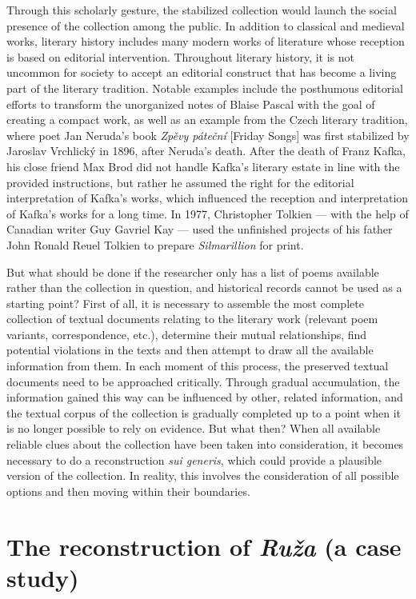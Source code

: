 \begin{paper}
Through this scholarly gesture, the stabilized collection would launch
the social presence of the collection among the public. In addition to
classical and medieval works, literary history includes many modern
works of literature whose reception is based on editorial intervention.
Throughout literary history, it is not uncommon for society to accept an
editorial construct that has become a living part of the literary
tradition. Notable examples include the posthumous editorial efforts to
transform the unorganized notes of Blaise Pascal with the goal of
creating a compact work, as well as an example from the Czech literary
tradition, where poet Jan Neruda's book \emph{Zpěvy páteční} [Friday
Songs] was first stabilized by Jaroslav Vrchlický in 1896, after
Neruda's death. After the death of Franz Kafka, his close friend Max
Brod did not handle Kafka's literary estate in line with the provided
instructions, but rather he assumed the right for the editorial
interpretation of Kafka's works, which influenced the reception and
interpretation of Kafka's works for a long time. In 1977, Christopher
Tolkien –– with the help of Canadian writer Guy Gavriel Kay –– used the
unfinished projects of his father John Ronald Reuel Tolkien to prepare
\emph{Silmarillion} for print.

But what should be done if the researcher only has a list of poems
available rather than the collection in question, and historical records
cannot be used as a starting point? First of all, it is necessary to
assemble the most complete collection of textual documents relating to
the literary work (relevant poem variants, correspondence, etc.),
determine their mutual relationships, find potential violations in the
texts and then attempt to draw all the available information from them.
In each moment of this process, the preserved textual documents need to
be approached critically. Through gradual accumulation, the information
gained this way can be influenced by other, related information, and the
textual corpus of the collection is gradually completed up to a point
when it is no longer possible to rely on evidence. But what then? When
all available reliable clues about the collection have been taken into
consideration, it becomes necessary to do a reconstruction \emph{sui
generis}, which could provide a plausible version of the collection. In
reality, this involves the consideration of all possible options and
then moving within their boundaries.

\section{The reconstruction of \emph{Ruža} (a case
study)}


\end{paper}
